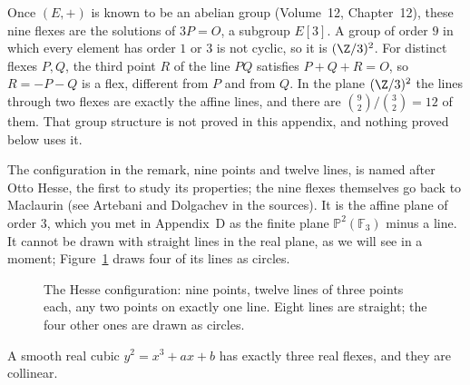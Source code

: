 \begin{remark}
Once $(E,+)$ is known to be an abelian group (Volume~12, Chapter~12), these nine flexes are the solutions of $3P=O$, a subgroup $E[3]$. A group of order $9$ in which every element has order $1$ or $3$ is not cyclic, so it is $(\Z/3)^2$. For distinct flexes $P,Q$, the third point $R$ of the line $PQ$ satisfies $P+Q+R=O$, so $R=-P-Q$ is a flex, different from $P$ and from $Q$. In the plane $(\Z/3)^2$ the lines through two flexes are exactly the affine lines, and there are $\binom92/\binom32=12$ of them. That group structure is not proved in this appendix, and nothing proved below uses it.
\end{remark}

The configuration in the remark, nine points and twelve lines, is named after Otto Hesse, the first to study its properties; the nine flexes themselves go back to
Maclaurin (see Artebani and Dolgachev in the sources). It is the affine plane of order $3$, which you met in Appendix~D as the finite plane $\mathbb P^2(\mathbb F_3)$
minus a line. It cannot be drawn with straight lines in the real plane, as we will see in a moment; Figure~\ref{geometry:fig:hesse} draws four of its lines as circles.

\begin{figure}[ht]
\centering
{}
\caption{The Hesse configuration: nine points, twelve lines of three points each, any two points on exactly one line. Eight lines are straight; the four
other ones are drawn as circles.}
\label{geometry:fig:hesse}
\end{figure}

\begin{theorem}\label{geometry:thm:realflexes}
A smooth real cubic $y^2=x^3+ax+b$ has exactly three real flexes, and they are collinear.
\end{theorem}


